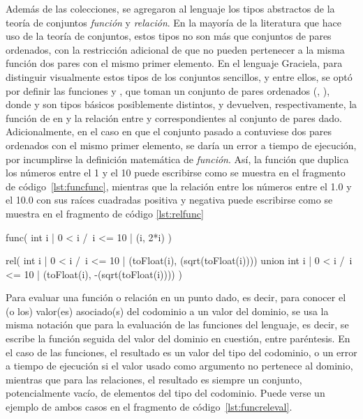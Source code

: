 Además de las colecciones, se agregaron al lenguaje los tipos abstractos de la
teoría de conjuntos \textit{función} y \textit{relación}. En la mayoría de la
literatura que hace uso de la teoría de conjuntos, estos tipos no son más que
conjuntos de pares ordenados, con la restricción adicional de que no pueden
pertenecer a la misma función dos pares con el mismo primer elemento. En el
lenguaje Graciela, para distinguir visualmente estos tipos de los conjuntos
sencillos, y entre ellos, se optó por definir las funciones  y
, que toman un conjunto de pares ordenados (, ),
donde  y  son tipos básicos posiblemente distintos, y
devuelven, respectivamente, la función de  en  y la relación
entre  y  correspondientes al conjunto de pares dado.
Adicionalmente, en el caso en que el conjunto pasado a  contuviese
dos pares ordenados con el mismo primer elemento, se daría un error a tiempo de
ejecución, por incumplirse la definición matemática de \textit{función}. Así, la
función que duplica los números entre el 1 y el 10 puede escribirse como se
muestra en el fragmento de código~\ref{lst:funcfunc}, mientras que la relación
entre los números entre el 1.0 y el 10.0 con sus raíces cuadradas positiva y
negativa puede escribirse como se muestra en el fragmento de código
\ref{lst:relfunc}

\begin{gracielacode}[caption=Expresión de tipo \textit{función}, label=lst:funcfunc]
func({ int i | 0 < i /\ i <= 10 | (i, 2*i) })
\end{gracielacode}

\begin{gracielacode}[caption=Expresión de tipo \textit{relación}, label=lst:relfunc]
rel(
  { int i | 0 < i /\ i <= 10 |
    (toFloat(i),  (sqrt(toFloat(i))))
  } union
  { int i | 0 < i /\ i <= 10 |
    (toFloat(i), -(sqrt(toFloat(i))))
  }
)
\end{gracielacode}

Para evaluar una función o relación en un punto dado, es decir, para conocer el
(o los) valor(es) asociado(s) del codominio a un valor del dominio, se usa la
misma notación que para la evaluación de las funciones del lenguaje, es decir,
se escribe la función seguida del valor del dominio en cuestión, entre
paréntesis. En el caso de las funciones, el resultado es un valor del tipo del
codominio, o un error a tiempo de ejecución si el valor usado como argumento no
pertenece al dominio, mientras que para las relaciones, el resultado es siempre
un conjunto, potencialmente vacío, de elementos del tipo del codominio. Puede
verse un ejemplo de ambos casos en el fragmento de código~\ref{lst:funcreleval}.

